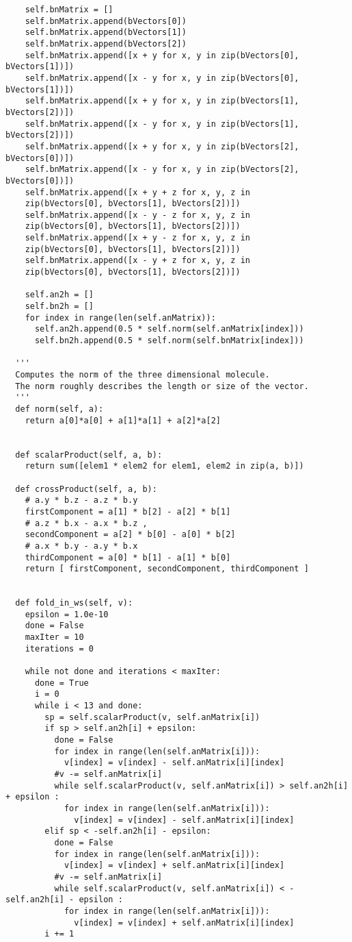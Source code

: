 \begin{verbatim}
    self.bnMatrix = []
    self.bnMatrix.append(bVectors[0])
    self.bnMatrix.append(bVectors[1])
    self.bnMatrix.append(bVectors[2])
    self.bnMatrix.append([x + y for x, y in zip(bVectors[0], bVectors[1])])
    self.bnMatrix.append([x - y for x, y in zip(bVectors[0], bVectors[1])])
    self.bnMatrix.append([x + y for x, y in zip(bVectors[1], bVectors[2])])
    self.bnMatrix.append([x - y for x, y in zip(bVectors[1], bVectors[2])])
    self.bnMatrix.append([x + y for x, y in zip(bVectors[2], bVectors[0])])
    self.bnMatrix.append([x - y for x, y in zip(bVectors[2], bVectors[0])])
    self.bnMatrix.append([x + y + z for x, y, z in 
    zip(bVectors[0], bVectors[1], bVectors[2])])
    self.bnMatrix.append([x - y - z for x, y, z in 
    zip(bVectors[0], bVectors[1], bVectors[2])])
    self.bnMatrix.append([x + y - z for x, y, z in 
    zip(bVectors[0], bVectors[1], bVectors[2])])
    self.bnMatrix.append([x - y + z for x, y, z in 
    zip(bVectors[0], bVectors[1], bVectors[2])])
         
    self.an2h = []
    self.bn2h = []
    for index in range(len(self.anMatrix)):
      self.an2h.append(0.5 * self.norm(self.anMatrix[index]))
      self.bn2h.append(0.5 * self.norm(self.bnMatrix[index]))
              
  '''
  Computes the norm of the three dimensional molecule.
  The norm roughly describes the length or size of the vector.
  '''
  def norm(self, a):
    return a[0]*a[0] + a[1]*a[1] + a[2]*a[2]
    
  
  def scalarProduct(self, a, b):
    return sum([elem1 * elem2 for elem1, elem2 in zip(a, b)])
    
  def crossProduct(self, a, b):
    # a.y * b.z - a.z * b.y
    firstComponent = a[1] * b[2] - a[2] * b[1]
    # a.z * b.x - a.x * b.z ,
    secondComponent = a[2] * b[0] - a[0] * b[2]
    # a.x * b.y - a.y * b.x
    thirdComponent = a[0] * b[1] - a[1] * b[0]
    return [ firstComponent, secondComponent, thirdComponent ]  
  
  
  def fold_in_ws(self, v):
    epsilon = 1.0e-10
    done = False
    maxIter = 10
    iterations = 0
    
    while not done and iterations < maxIter:
      done = True
      i = 0
      while i < 13 and done:
        sp = self.scalarProduct(v, self.anMatrix[i])
        if sp > self.an2h[i] + epsilon:
          done = False
          for index in range(len(self.anMatrix[i])):
            v[index] = v[index] - self.anMatrix[i][index]
          #v -= self.anMatrix[i]
          while self.scalarProduct(v, self.anMatrix[i]) > self.an2h[i] + epsilon :
            for index in range(len(self.anMatrix[i])):
              v[index] = v[index] - self.anMatrix[i][index]
        elif sp < -self.an2h[i] - epsilon:
          done = False
          for index in range(len(self.anMatrix[i])):
            v[index] = v[index] + self.anMatrix[i][index]
          #v -= self.anMatrix[i]
          while self.scalarProduct(v, self.anMatrix[i]) < -self.an2h[i] - epsilon :
            for index in range(len(self.anMatrix[i])):
              v[index] = v[index] + self.anMatrix[i][index]
        i += 1
      

\end{verbatim}
